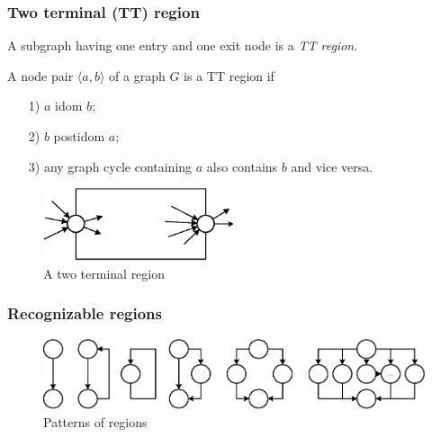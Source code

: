 \documentclass{beamer}
\begin{document}

\begin{frame}
\frametitle{Two terminal (TT) region}

\newtheorem{TT}{Definition}[section]
\begin{Def}
A subgraph having one entry and one exit node is a \emph{TT region}.

A node pair $\langle a, b\rangle$ of a graph $G$ is a TT region if
	\begin{enumerate}
		\item[1)]
			$a$ idom $b$;
		\item[2)]
			$b$ postidom $a$;
		\item[3)]
			any graph cycle containing $a$ also contains $b$ and vice versa.
	\end{enumerate}
\end{Def}


\begin{figure}[htbp]
	\centering
		\includegraphics[width=0.5\textwidth]{Pic/TTRegion.eps}
	\caption{A two terminal region}
	\label{fig:TTRegion}
\end{figure}

\end{frame}


\begin{frame}
\frametitle{Recognizable regions}
\begin{figure}[htbp]
	\centering
		\includegraphics[width=1\textwidth]{Pic/Reg.eps}
	\caption{Patterns of regions}
	\label{fig:Regions}
\end{figure}
\end{frame}
\end{document}
